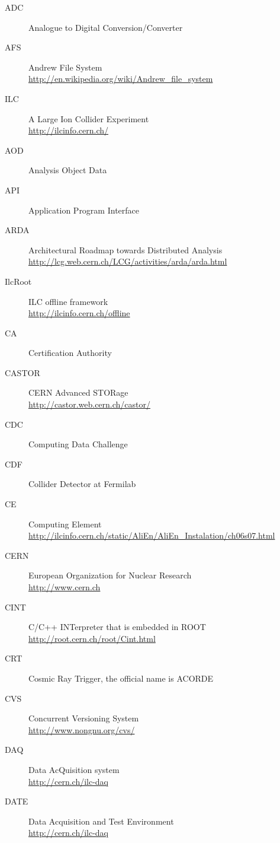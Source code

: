 \documentclass[12pt,a4paper,twoside]{article}
\begin{document}
{\begin{description}
\item[ADC]Analogue to Digital Conversion/Converter
\item[AFS]Andrew File System\\{\footnotesize \url{http://en.wikipedia.org/wiki/Andrew_file_system}}
\item[ILC]A Large Ion Collider Experiment\\{\footnotesize \url{http://ilcinfo.cern.ch/}}
\item[AOD]Analysis Object Data
\item[API]Application Program Interface
\item[ARDA]Architectural Roadmap towards Distributed Analysis\\{\footnotesize \url{http://lcg.web.cern.ch/LCG/activities/arda/arda.html}}
\item[IlcRoot]ILC offline framework\\{\footnotesize \url{http://ilcinfo.cern.ch/offline}}
\item[CA]Certification Authority
\item[CASTOR]CERN Advanced STORage\\{\footnotesize \url{http://castor.web.cern.ch/castor/}}
\item[CDC]Computing Data Challenge
\item[CDF]Collider Detector at Fermilab
\item[CE]Computing Element\\{\footnotesize \url{http://ilcinfo.cern.ch/static/AliEn/AliEn_Instalation/ch06s07.html}}
\item[CERN]European Organization for Nuclear Research\\{\footnotesize \url{http://www.cern.ch}}
\item[CINT]C/C++ INTerpreter that is embedded in ROOT\\{\footnotesize \url{http://root.cern.ch/root/Cint.html}}
\item[CRT]Cosmic Ray Trigger, the official name is ACORDE\\{\footnotesize \url{}}
\item[CVS]Concurrent Versioning System\\{\footnotesize \url{http://www.nongnu.org/cvs/}}
\item[DAQ]Data AcQuisition system\\{\footnotesize \url{http://cern.ch/ilc-daq}}
\item[DATE]Data Acquisition and Test Environment\\{\footnotesize \url{http://cern.ch/ilc-daq}}

\end{description}}
\end{document}
